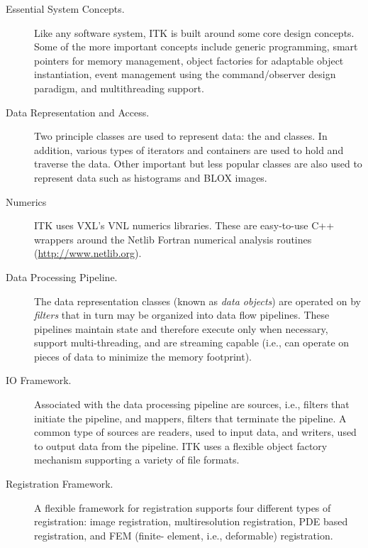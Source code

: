\begin{description}
	\item[Essential System Concepts.] Like any software system, ITK is
        built around some core design concepts. Some of the more important
        concepts include generic programming, smart pointers for memory
        management, object factories for adaptable object instantiation,
        event management using the command/observer design paradigm, and
        multithreading support.

	\item[Data Representation and Access.]  Two principle classes are
        used to represent data: the  and 
        classes.  In addition, various types of iterators and containers are
        used to hold and traverse the data. Other important but less popular
        classes are also used to represent data such as histograms and BLOX
        images.

	\item[Numerics] ITK uses VXL's VNL numerics libraries. These are
        easy-to-use C++ wrappers around the Netlib Fortran numerical 
        analysis routines (\url{http://www.netlib.org}).

	\item[Data Processing Pipeline.]  The data representation classes
        (known as \emph{data objects}) are operated on by \emph{filters} that
        in turn may be organized into data flow pipelines. These pipelines
        maintain state and therefore execute only when necessary, support
        multi-threading, and are streaming capable (i.e., can operate on
        pieces of data to minimize the memory footprint).

        \item[IO Framework.] Associated with the data processing pipeline are
        sources, i.e., filters that initiate the pipeline, and mappers,
        filters that terminate the pipeline. A common type of
        sources are readers, used to input data, and writers, used to
        output data from the pipeline. ITK uses a flexible object factory
        mechanism supporting a variety of file formats.

	\item[Registration Framework.] A flexible framework for registration
        supports four different types of registration: image registration,
        multiresolution registration, PDE based registration, and FEM (finite-
        element, i.e., deformable) registration.


\end{description}
